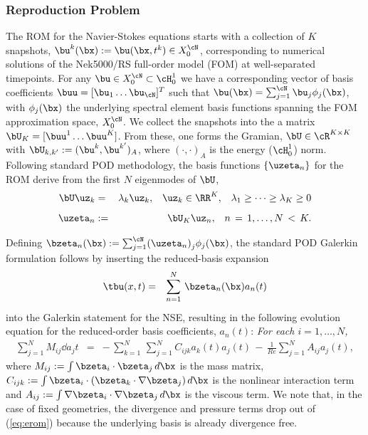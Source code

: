 \vspace*{.08in}
\subsubsection*{Reproduction Problem}

The ROM for the Navier-Stokes equations starts with a collection of $K$
snapshots, $\bu^k(\bx) := \bu(\bx,t^k) \in X_0^{\cN}$, corresponding to
numerical solutions of the Nek5000/RS full-order model (FOM) at well-separated
timepoints.  For any $\bu \in X_0^{\cN} \subset \cH^1_0$ we have a
corresponding vector of basis coefficients $\buu=[\bu_1\dots \bu_{\cN}]^T$ such
that $\bu(\bx)=\sum_{j=1}^\cN \bu_j \phi_j(\bx)$, with $\phi_j(\bx)$ the
underlying spectral element basis functions spanning the FOM approximation
space, $X_0^\cN$.  We collect the snapshots into the a matrix $\bU_K = [ \buu^1
\dots \buu^K ]$.  From these, one forms the Gramian, $\bU \in \cR^{K \times K}$
with $\bU_{k,k'} := (\bu^k,\bu^{k'})_A$, where $(\cdot,\cdot)_A$ is the energy
($\cH_0^1$) norm.  Following standard POD methodology, the basis functions $\{
\uzeta_n \}$ for the ROM derive from the first $N$ eigenmodes of $\bU$,
\\[-3.3ex]
\begin{eqnarray} \label{eq:eig}
\bU\uz_k&=&\lambda_k \uz_k,\;\;\;\uz_k \in \RR^K, \;\;\; \lambda_1 
        \ge \cdots \ge \lambda_K \ge 0
                    \\[1.2ex] \label{eq:podbasis}
\uzeta_n &:=& \bU_K \uz_n, \;\;\; n\,=\,1,\dots,N \, < \, K.
\end{eqnarray}

Defining $\bzeta_n(\bx) := \sum_{j=1}^{\cN} (\uzeta_n)^{}_j \phi_j(\bx)$, 
the standard POD Galerkin formulation follows by inserting the reduced-basis
expansion
\\[-6.5ex]
\begin{eqnarray} \nonumber
\tbu(x,t) &=& \sum_{n=1}^N \, \bzeta_n(\bx) a_n(t)  \\[-3.3ex] \nonumber
\end{eqnarray}
into the Galerkin statement for the NSE, resulting in the following
evolution equation for the reduced-order basis coefficients, $a_n(t)$:
{\em For each $i=1,\dots,N$,} \\[-3.3ex]
\begin{eqnarray} \label{eq:erom}
\sum_{j=1}^N M_{ij} \dd{a_j}{t} &=&
- \, \sum_{k=1}^N \, \sum_{j=1}^N C_{ijk} a_k(t) a_j(t) 
\,-\, \frac{1}{Re} \sum_{j=1}^N A_{ij} a_j(t),
\end{eqnarray}
where 
$M_{ij} := \int \bzeta_i \cdot \bzeta_j  \, d\bx$ is the mass matrix,
$C_{ijk} := \int \bzeta_i \cdot ( \bzeta_k \cdot \nabla \bzeta_j) \, d\bx$
is the nonlinear interaction term and 
$A_{ij} := \int \nabla \bzeta_i \cdot \nabla \bzeta_j \, d\bx$
is the viscous term.  We note that, in the case of fixed geometries, 
the divergence and pressure terms drop out of (\ref{eq:erom}) because
the underlying basis is already divergence free.

